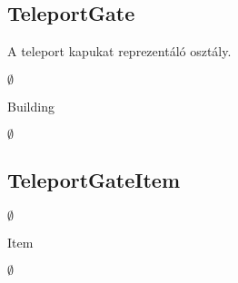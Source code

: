 \subsection{TeleportGate}
\begin{class-template-responsibility}
A teleport kapukat reprezentáló osztály.
\end{class-template-responsibility}
\begin{class-template-interface}
$\emptyset$
\end{class-template-interface}
\begin{class-template-baseclass}
Building
\end{class-template-baseclass}
\begin{class-template-attribute}
\item[] $\emptyset$
\end{class-template-attribute}
\begin{class-template-method}
\end{class-template-method}


\subsection{TeleportGateItem}
\begin{class-template-responsibility}

\end{class-template-responsibility}
\begin{class-template-interface}
$\emptyset$
\end{class-template-interface}
\begin{class-template-baseclass}
Item
\end{class-template-baseclass}
\begin{class-template-attribute}
\item[] $\emptyset$
\end{class-template-attribute}
\begin{class-template-method}
\end{class-template-method}


